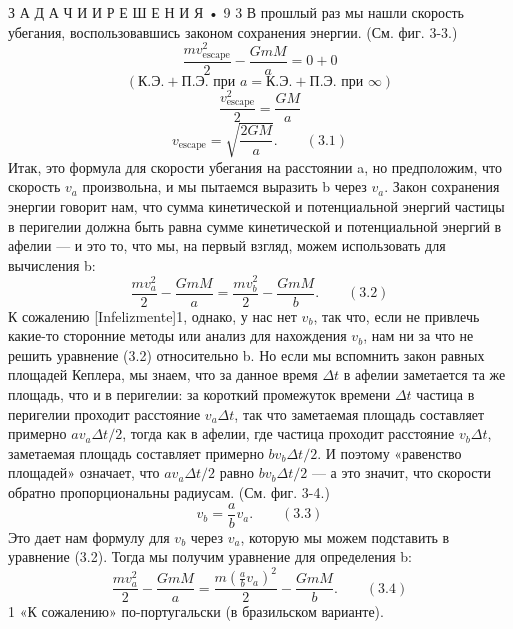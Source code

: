 \documentclass[10pt,oneside]{article}
\begin{document}
З А Д А Ч И  И  Р Е Ш Е Н И Я • 9 3 В прошлый раз мы нашли скорость убегания, воспользовавшись законом сохранения энергии. (См. фиг. 3-3.) \[\frac{m v_{\text{escape}}^2}{2} - \frac{GmM}{a} = 0 + 0\] \[(\text{К.Э.} + \text{П.Э. при } a = \text{К.Э.} + \text{П.Э. при } \infty)\] \[\frac{v_{\text{escape}}^2}{2} = \frac{GM}{a}\] \[v_{\text{escape}} = \sqrt{\frac{2GM}{a}}. \qquad (3.1)\] Итак, это формула для скорости убегания на расстоянии a, но предположим, что скорость \(v_a\) произвольна, и мы пытаемся выразить b через \(v_a\). Закон сохранения энергии говорит нам, что сумма кинетической и потенциальной энергий частицы в перигелии должна быть равна сумме кинетической и потенциальной энергий в афелии --- и это то, что мы, на первый взгляд, можем использовать для вычисления b: \[\frac{m v_a^2}{2} - \frac{GmM}{a} = \frac{m v_b^2}{2} - \frac{GmM}{b}. \qquad (3.2)\] К сожалению [Infelizmente]1, однако, у нас нет \(v_b\), так что, если не привлечь какие-то сторонние методы или анализ для нахождения \(v_b\), нам ни за что не решить уравнение (3.2) относительно b. Но если мы вспомнить закон равных площадей Кеплера, мы знаем, что за данное время \(\Delta t\) в афелии заметается та же площадь, что и в перигелии: за короткий промежуток времени \(\Delta t\) частица в перигелии проходит расстояние \(v_a \Delta t\), так что заметаемая площадь составляет примерно \(a v_a \Delta t / 2\), тогда как в афелии, где частица проходит расстояние \(v_b \Delta t\), заметаемая площадь составляет примерно \(b v_b \Delta t / 2\). И поэтому «равенство площадей» означает, что \(a v_a \Delta t / 2\) равно \(b v_b \Delta t / 2\) --- а это значит, что скорости обратно пропорциональны радиусам. (См. фиг. 3-4.) \[v_b = \frac{a}{b} v_a. \qquad (3.3)\] Это дает нам формулу для \(v_b\) через \(v_a\), которую мы можем подставить в уравнение (3.2). Тогда мы получим уравнение для определения b: \[\frac{m v_a^2}{2} - \frac{GmM}{a} = \frac{m \left(\frac{a}{b} v_a\right)^2}{2} - \frac{GmM}{b}. \qquad (3.4)\] 1 «К сожалению» по-португальски (в бразильском варианте).\par
\end{document}
